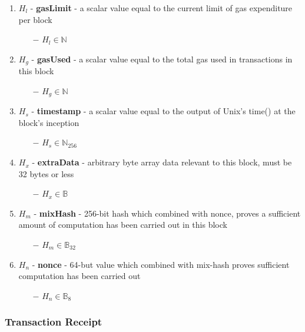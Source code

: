 \documentclass{article}
\begin{document}
\begin{enumerate}
\begin{enumerate}
\begin{enumerate}
        \end{enumerate}
        \item $H_l$ - \textbf{gasLimit} - a scalar value equal to the current limit of gas expenditure per block
        \begin{enumerate}
            \item[$-$] $H_l \in \mathbb{N}$
        \end{enumerate}
        \item $H_g$ - \textbf{gasUsed} - a scalar value equal to the total gas used in transactions in this block
        \begin{enumerate}
            \item[$-$] $H_g \in \mathbb{N}$
        \end{enumerate}
        \item $H_s$ - \textbf{timestamp} - a scalar value equal to the output of Unix's time() at the block's inception
        \begin{enumerate}
            \item[$-$] $H_s \in \mathbb{N}_{256}$
        \end{enumerate}
        \item $H_x$ - \textbf{extraData} - arbitrary byte array data relevant to this block, must be 32 bytes or less
        \begin{enumerate}
            \item[$-$] $H_x \in \mathbb{B}$
        \end{enumerate}
        \item $H_m$ - \textbf{mixHash} - 256-bit hash which combined with nonce, proves a sufficient amount of computation has been carried out in this block
        \begin{enumerate}
            \item[$-$] $H_m \in \mathbb{B}_{32}$
        \end{enumerate}
        \item $H_n$ - \textbf{nonce} - 64-but value which combined with mix-hash proves sufficient computation has been carried out
        \begin{enumerate}
            \item[$-$] $H_n \in \mathbb{B}_8$
        \end{enumerate}
    \end{enumerate}
\end{enumerate}

\subsubsection{Transaction Receipt}
\end{document}
